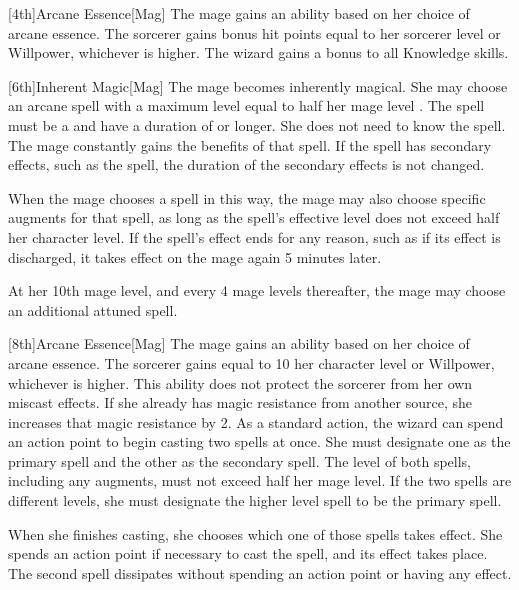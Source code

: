         [4th]{Arcane Essence}[Mag]
        The mage gains an ability based on her choice of arcane essence.
         The sorcerer gains bonus hit points equal to her sorcerer level or Willpower, whichever is higher.
         The wizard gains a  bonus to all Knowledge skills.

        [6th]{Inherent Magic}[Mag]
        The mage becomes inherently magical.
        She may choose an arcane spell with a maximum level equal to half her mage level .
        The spell must be a  and have a duration of \durshort or longer.
        She does not need to know the spell.
        The mage constantly gains the benefits of that spell.
        If the spell has secondary effects, such as the  spell, the duration of the secondary effects is not changed.

        When the mage chooses a spell in this way, the mage may also choose specific augments for that spell, as long as the spell's effective level does not exceed half her character level.
        If the spell's effect ends for any reason, such as if its effect is discharged, it takes effect on the mage again 5 minutes later.

        At her 10th mage level, and every 4 mage levels thereafter, the mage may choose an additional attuned spell.

        [8th]{Arcane Essence}[Mag]
        The mage gains an ability based on her choice of arcane essence.
         The sorcerer gains  equal to 10 \add her character level or Willpower, whichever is higher.
        This ability does not protect the sorcerer from her own miscast effects.
        If she already has magic resistance from another source, she increases that magic resistance by 2.
         As a standard action, the wizard can spend an action point to begin casting two spells at once.
        She must designate one as the primary spell and the other as the secondary spell.
        The level of both spells, including any augments, must not exceed half her mage level.
        If the two spells are different levels, she must designate the higher level spell to be the primary spell.

        When she finishes casting, she chooses which one of those spells takes effect.
        She spends an action point if necessary to cast the spell, and its effect takes place.
        The second spell dissipates without spending an action point or having any effect.

